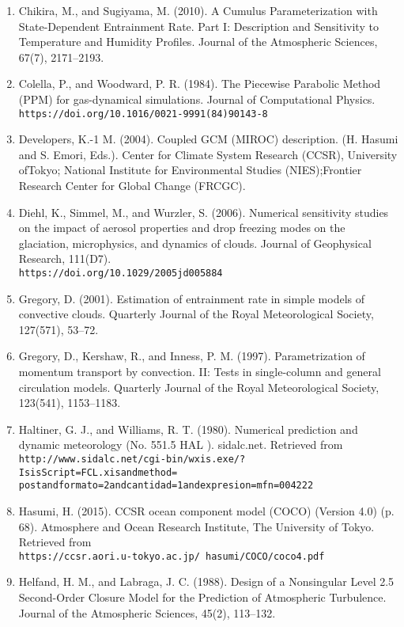 \begin{enumerate}
\item Chikira, M., and Sugiyama, M. (2010). A Cumulus Parameterization with State-Dependent Entrainment Rate. Part I: Description and Sensitivity to Temperature and Humidity Profiles. Journal of the Atmospheric Sciences, 67(7), 2171–2193.
\item Colella, P., and Woodward, P. R. (1984). The Piecewise Parabolic Method (PPM) for gas-dynamical simulations. Journal of Computational Physics. \\
\texttt{https://doi.org/10.1016/0021-9991(84)90143-8}
\item Developers, K.-1 M. (2004). Coupled GCM (MIROC) description. (H. Hasumi and S. Emori, Eds.). Center for Climate System Research (CCSR), University ofTokyo; National Institute for Environmental Studies (NIES);Frontier Research Center for Global Change (FRCGC).
\item Diehl, K., Simmel, M., and Wurzler, S. (2006). Numerical sensitivity studies on the impact of aerosol properties and drop freezing modes on the glaciation, microphysics, and dynamics of clouds. Journal of Geophysical Research, 111(D7). \\
\texttt{https://doi.org/10.1029/2005jd005884}
\item Gregory, D. (2001). Estimation of entrainment rate in simple models of convective clouds. Quarterly Journal of the Royal Meteorological Society, 127(571), 53–72.
\item Gregory, D., Kershaw, R., and Inness, P. M. (1997). Parametrization of momentum transport by convection. II: Tests in single-column and general circulation models. Quarterly Journal of the Royal Meteorological Society, 123(541), 1153–1183.
\item Haltiner, G. J., and Williams, R. T. (1980). Numerical prediction and dynamic meteorology (No. 551.5 HAL ). sidalc.net. Retrieved from \\
\texttt{http://www.sidalc.net/cgi-bin/wxis.exe/?IsisScript=FCL.xisandmethod=\\
postandformato=2andcantidad=1andexpresion=mfn=004222}
\item Hasumi, H. (2015). CCSR ocean component model (COCO) (Version 4.0) (p. 68). Atmosphere and Ocean Research Institute, The University of Tokyo. Retrieved from \\
\texttt{https://ccsr.aori.u-tokyo.ac.jp/~hasumi/COCO/coco4.pdf}
\item Helfand, H. M., and Labraga, J. C. (1988). Design of a Nonsingular Level 2.5 Second-Order Closure Model for the Prediction of Atmospheric Turbulence. Journal of the Atmospheric Sciences, 45(2), 113–132.

\end{enumerate}
